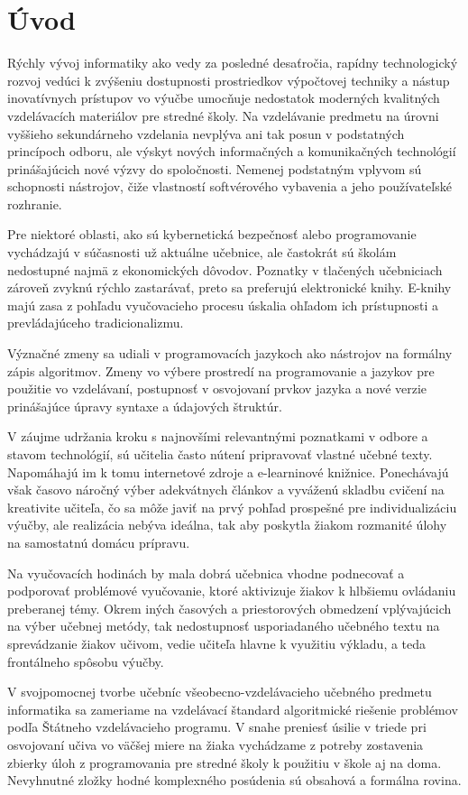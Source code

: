 \chapter{Úvod}
Rýchly vývoj informatiky ako vedy za posledné desaťročia, rapídny technologický rozvoj vedúci k zvýšeniu dostupnosti prostriedkov výpočtovej techniky a nástup inovatívnych prístupov vo výučbe umocňuje nedostatok moderných kvalitných vzdelávacích materiálov pre stredné školy. Na vzdelávanie predmetu na úrovni vyššieho sekundárneho vzdelania nevplýva ani tak posun v podstatných princípoch odboru, ale výskyt nových informačných a komunikačných technológií prinášajúcich nové výzvy do spoločnosti. Nemenej podstatným vplyvom sú schopnosti nástrojov, čiže vlastností softvérového vybavenia a jeho používateľské rozhranie.

Pre niektoré oblasti, ako sú kybernetická bezpečnosť alebo programovanie vychádzajú v súčasnosti už aktuálne učebnice, ale častokrát sú školám nedostupné najmä z ekonomických dôvodov. Poznatky v tlačených učebniciach zároveň zvyknú rýchlo zastarávať, preto sa preferujú elektronické knihy. E-knihy majú zasa z pohľadu vyučovacieho procesu úskalia ohľadom ich prístupnosti a prevládajúceho tradicionalizmu.

Význačné zmeny sa udiali v programovacích jazykoch ako nástrojov na formálny zápis algoritmov. Zmeny vo výbere prostredí na programovanie a jazykov pre použitie vo vzdelávaní, postupnosť v osvojovaní prvkov jazyka a nové verzie prinášajúce úpravy syntaxe a údajových štruktúr.

V záujme udržania kroku s najnovšími relevantnými poznatkami v odbore a stavom technológií, sú učitelia často nútení pripravovať vlastné učebné texty. Napomáhajú im k tomu internetové zdroje a e-learninové knižnice. Ponechávajú však časovo náročný výber adekvátnych článkov a vyváženú skladbu cvičení na kreativite učiteľa, čo sa môže javiť na prvý pohľad prospešné pre individualizáciu výučby, ale realizácia nebýva ideálna, tak aby poskytla žiakom rozmanité úlohy na samostatnú domácu prípravu.

Na vyučovacích hodinách by mala dobrá učebnica vhodne podnecovať a podporovať problémové vyučovanie, ktoré aktivizuje žiakov k hlbšiemu ovládaniu preberanej témy. Okrem iných časových a priestorových obmedzení vplývajúcich na výber učebnej metódy, tak nedostupnosť usporiadaného učebného textu na sprevádzanie žiakov učivom, vedie učiteľa hlavne k využitiu výkladu, a teda frontálneho spôsobu výučby.

V svojpomocnej tvorbe učebníc všeobecno-vzdelávacieho učebného predmetu informatika sa zameriame na vzdelávací štandard algoritmické riešenie problémov podľa Štátneho vzdelávacieho programu. V snahe preniesť úsilie v triede pri osvojovaní učiva vo väčšej miere na žiaka vychádzame z potreby zostavenia zbierky úloh z programovania pre stredné školy k použitiu v škole aj na doma. Nevyhnutné zložky hodné komplexného posúdenia sú obsahová a formálna rovina.

